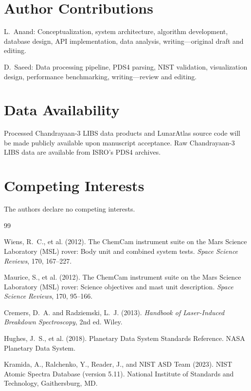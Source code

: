 \documentclass[12pt,a4paper]{article}
\begin{document}
\section*{Author Contributions}

L.~Anand: Conceptualization, system architecture, algorithm development, database design, API implementation, data analysis, writing---original draft and editing.

D.~Saeed: Data processing pipeline, PDS4 parsing, NIST validation, visualization design, performance benchmarking, writing---review and editing.

\section*{Data Availability}

Processed Chandrayaan-3 LIBS data products and LunarAtlas source code will be made publicly available upon manuscript acceptance. Raw Chandrayaan-3 LIBS data are available from ISRO's PDS4 archives.

\section*{Competing Interests}

The authors declare no competing interests.

\begin{thebibliography}{99}

Wiens, R.~C., et al. (2012).
The ChemCam instrument suite on the Mars Science Laboratory (MSL) rover: Body unit and combined system tests.
\emph{Space Science Reviews}, 170, 167--227.

Maurice, S., et al. (2012).
The ChemCam instrument suite on the Mars Science Laboratory (MSL) rover: Science objectives and mast unit description.
\emph{Space Science Reviews}, 170, 95--166.

Cremers, D.~A. and Radziemski, L.~J. (2013).
\emph{Handbook of Laser-Induced Breakdown Spectroscopy}, 2nd ed.
Wiley.

Hughes, J.~S., et al. (2018).
Planetary Data System Standards Reference.
NASA Planetary Data System.

Kramida, A., Ralchenko, Y., Reader, J., and NIST ASD Team (2023).
NIST Atomic Spectra Database (version 5.11).
National Institute of Standards and Technology, Gaithersburg, MD.


\end{thebibliography}
\end{document}
